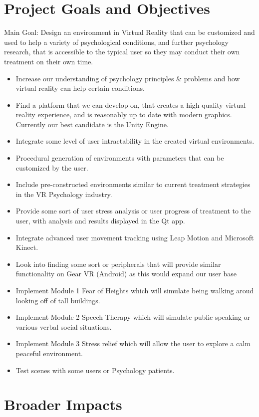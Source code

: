 \documentclass[a4paper,10pt]{article}
\begin{document}
\section{Project Goals and Objectives}
	Main Goal: Design an environment in Virtual Reality that can be customized and used to help a variety of psychological conditions, and further psychology research, that is accessible to the typical user so they may conduct their own treatment on their own time.
	\begin{itemize}
		\item Increase our understanding of psychology principles \& problems and how virtual reality can help certain conditions.
		\item Find a platform that we can develop on, that creates a high quality virtual reality experience, and is reasonably up to date with modern graphics. Currently our best candidate is the Unity Engine.
		\item Integrate some level of user intractability in the created virtual environments. 
		\item Procedural generation of environments with parameters that can be customized by the user.
		\item Include pre-constructed environments similar to current treatment strategies in the VR Psychology industry.
		\item Provide some sort of user stress analysis or user progress of treatment to the user, with analysis and results displayed in the Qt app.
		\item Integrate advanced user movement tracking using Leap Motion and Microsoft Kinect.
		\item Look into finding some sort or peripherals that will provide similar functionality on Gear VR (Android) as this would expand our user base
		\item Implement Module 1 Fear of Heights which will simulate being walking aroud looking off of tall buildings.
		\item Implement Module 2 Speech Therapy which will simulate public speaking or various verbal social situations. 
		\item Implement Module 3 Stress relief which will allow the user to explore a calm peaceful environment.
		\item Test scenes with some users or Psychology patients.
		
	\end{itemize}
	\pagebreak
	\section{Broader Impacts}
	
\end{document}
